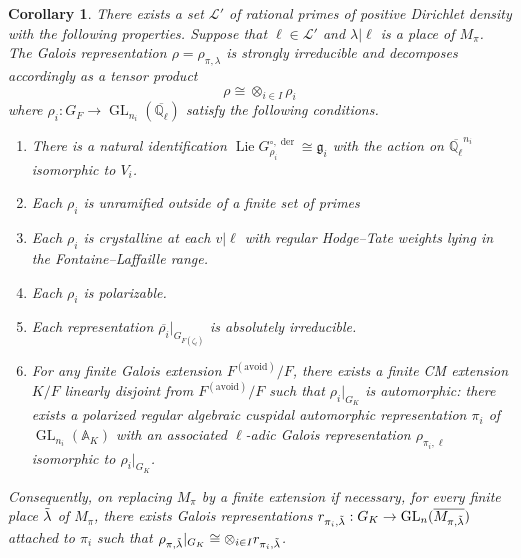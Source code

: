 \documentclass{amsart}
\newtheorem{corollary}[theorem]{Corollary}
\theoremstyle{definition}
\numberwithin{equation}{section} %
\newcommand{\GL}{\operatorname{GL}}
\newcommand{\Lie}{\operatorname{Lie}}
\newcommand{\der}{\operatorname{der}}
\newcommand{\Qlbar}{\ensuremath{\overline{\mathbb{Q}_\ell}}}
\newcommand{\bb}[1]{\mathbb{#1}}
\newcommand{\mf}[1]{\mathfrak{#1}}
\begin{document}
\begin{corollary} \label{cor: tensorands are potentially automorphic}
There exists a set $\mathcal{L}'$ of rational primes of positive Dirichlet density with the following properties.
Suppose that $\ell \in \mathcal{L}'$ and $\lambda|\ell$ is a place of $M_\pi$.
The Galois representation $\rho = \rho_{\pi,\lambda}$ is strongly irreducible and decomposes accordingly as a tensor product
\[
\rho \cong \otimes_{i \in I} \rho_i
\]
where $\rho_i: G_F \to \GL_{n_i}(\Qlbar)$ satisfy the following conditions.
\begin{enumerate}
    \item There is a natural identification 
    $\Lie G_{\rho_i}^{\circ,\der} \cong \mf{g}_i$ with the action on $\Qlbar^{n_i}$ isomorphic to $V_i$.
    \item Each $\rho_i$ is unramified outside of a finite set of primes
    \item Each $\rho_i$ is crystalline at each $v|\ell$ with regular Hodge--Tate weights lying in the Fontaine--Laffaille range.
    \item Each $\rho_i$ is polarizable.
    \item Each representation $\overline{\rho_i}|_{G_{F(\zeta_\ell)}}$ is absolutely irreducible.
    \item For any finite Galois extension $F^{\mathrm{(avoid)}}/F$, there exists a finite CM extension $K/F$ linearly disjoint from $F^{\mathrm{(avoid)}}/F$ such that $\rho_i|_{G_K}$ is automorphic: there exists a polarized regular algebraic cuspidal automorphic representation $\pi_i$ of $\GL_{n_i}(\bb{A}_K)$ with an associated $\ell$-adic Galois representation $\rho_{\pi_i,\ell}$ isomorphic to $\rho_i|_{G_K}$.
\end{enumerate}
Consequently, on replacing $M_\pi$ by a finite extension if necessary, for every finite place $\Tilde{\lambda}$ of $M_{\pi}$, there exists Galois representations $r_{\pi_i, \Tilde{\lambda}}: G_K \to \GL_n(\overline{M_{\pi,\Tilde{\lambda}}})$ attached to $\pi_i$ such that $\rho_{\pi,\Tilde{\lambda}}|_{G_K} \cong \otimes_{i \in I} r_{\pi_i, \Tilde{\lambda}}$.
\end{corollary}
\end{document}
